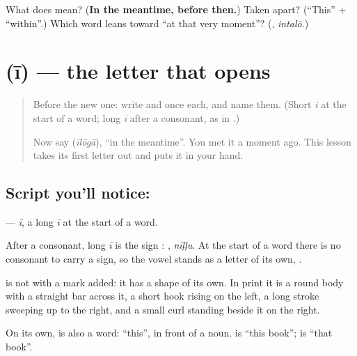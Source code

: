 \begin{tcolorbox}[breakable,colback=teal!4,colframe=teal!35!black,title={Before you move on}]
What does \textbf{} mean? (\textbf{In the meantime, before then.}) Taken apart? (\textquotedblleft{}This\textquotedblright{} + \textquotedblleft{}within\textquotedblright{}.) Which word leans toward \textquotedblleft{}at that very moment\textquotedblright{}? (\textbf{}, \emph{intalō}.)
\end{tcolorbox}
\section[\texorpdfstring{\te{ఈ} (ī)}{ఈ (ī)}]{ (ī) — the letter that opens }

\label{lesson:TE-S174-letter-ii}



\begin{quote}
Before the new one: write \textbf{} and \textbf{} once each, and name them. (Short \emph{i} at the start of a word; long \emph{ī} after a consonant, as in \textbf{}.)

Now say \textbf{} (\emph{īlōgā}), \textquotedblleft{}in the meantime\textquotedblright{}. You met it a moment ago. This lesson takes its first letter out and puts it in your hand.
\end{quote}

\subsection*{Script you'll notice: }
\textbf{} — \emph{ī}, a long \emph{ī} at the start of a word.

After a consonant, long \emph{ī} is the sign \textbf{}: \textbf{}, \emph{nīḷḷu}. At the start of a word there is no consonant to carry a sign, so the vowel stands as a letter of its own, \textbf{}.

\textbf{} is not \textbf{} with a mark added: it has a shape of its own. In print it is a round body with a straight bar across it, a short hook rising on the left, a long stroke sweeping up to the right, and a small curl standing beside it on the right.

On its own, \textbf{} is also a word: \textquotedblleft{}this\textquotedblright{}, in front of a noun. \textbf{ } is \textquotedblleft{}this book\textquotedblright{}; \textbf{ } is \textquotedblleft{}that book\textquotedblright{}.

